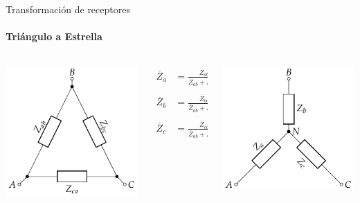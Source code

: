 \documentclass[aspectratio=169, usenames,svgnames,dvipsnames]{beamer}
\begin{document}
\begin{frame}[label={sec:org2df140d}]{Transformación de receptores}
\framesubtitle{Triángulo a Estrella}
\begin{columns}
\begin{column}{0.3\columnwidth}
\begin{center}
\includegraphics[height=0.5\textheight]{../figs/Impedancia_Triangulo.pdf}
\end{center}
\end{column}


\begin{column}{0.3\columnwidth}
\begin{align*}
  \overline{Z}_a &= \frac{\overline{Z}_{ab} \cdot \overline{Z}_{ca}}{\overline{Z}_{ab} + \overline{Z}_{bc} + \overline{Z}_{ca}}\\
  \\
  \overline{Z}_b &= \frac{\overline{Z}_{bc} \cdot \overline{Z}_{ab}}{\overline{Z}_{ab} + \overline{Z}_{bc} + \overline{Z}_{ca}}\\
  \\
  \overline{Z}_c &= \frac{\overline{Z}_{ca} \cdot \overline{Z}_{bc}}{\overline{Z}_{ab} + \overline{Z}_{bc} + \overline{Z}_{ca}}\\
\end{align*}
\end{column}
\begin{column}{0.3\columnwidth}
\begin{center}
\includegraphics[height=0.5\textheight]{../figs/Impedancia_Estrella.pdf}
\end{center}
\end{column}
\end{columns}
\end{frame}
\end{document}
